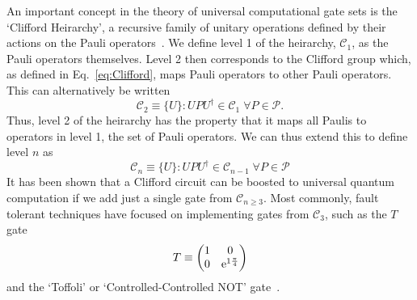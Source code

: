 \documentclass{standalone}
\begin{document}
\par
An important concept in the theory of universal computational gate sets is the `Clifford Heirarchy', a recursive family of unitary operations defined by their actions on the Pauli operators~\cite{Gottesman1999b}. We define level 1 of the heirarchy, $\mathcal{C}_{1}$, as the Pauli operators themselves. Level 2 then corresponds to the Clifford group which, as defined in Eq.~\ref{eq:Clifford}, maps Pauli operators to other Pauli operators. This can alternatively be written
\begin{equation}\label{eq:c2}
\mathcal{C}_{2} \equiv \{U\} : UPU^{\dagger}\in\mathcal{C}_{1}\;\forall P\in\mathcal{P}.
\end{equation}
Thus, level 2 of the heirarchy has the property that it maps all Paulis to operators in level 1, the set of Pauli operators. We can thus extend this to define level $n$ as
\begin{equation}\label{eq:heirarchy}
\mathcal{C}_{n}\equiv\{U\} : UPU^{\dagger}\in\mathcal{C}_{n-1}\;\forall P\in\mathcal{P}
\end{equation}
It has been shown that a Clifford circuit can be boosted to universal quantum computation if we add just a single gate from $\mathcal{C}_{n\geq3}$. Most commonly, fault tolerant techniques have focused on implementing gates from $\mathcal{C}_{3}$, such as the $T$ gate 
\[T\equiv\begin{pmatrix}1&0\\0&\mathrm{e}^{1\frac{\pi}{4}}\end{pmatrix}\]
and the `Toffoli' or `Controlled-Controlled NOT' gate~\cite{Shor1997,Gottesman1999b}. 
\end{document}
